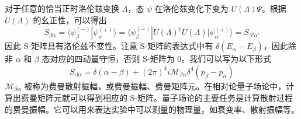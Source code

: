 对于任意的恰当正时洛伦兹变换 $\Lambda$，态 $\psi$ 在洛伦兹变化下变为 $U(\Lambda)\Psi$。根据 $U(\Lambda)$ 的幺正性，可以得出
\begin{equation}\label{eq_Smat_1}
S_{\beta\alpha}=\langle \psi_\beta^{(-)}| \psi_\alpha^{(+)} \rangle=\langle \psi_\beta^{(-)}| U(\Lambda)^\dagger U(\Lambda) |\psi_\alpha^{(+)} \rangle=S_{\beta'\alpha'}
\end{equation}
因此 S-矩阵具有洛伦兹不变性。注意 S-矩阵的表达式中有 $\delta(E_\alpha-E_\beta)$，因此除非 $\alpha$ 和 $\beta$ 态对应的四动量守恒，否则 S-矩阵为 $0$。我们可以写为以下形式
\begin{equation}
S_{\beta\alpha}=\delta(\alpha-\beta)+(2\pi)^4 i \mathcal{M}_{\beta\alpha}\delta^4(p_\beta-p_\alpha)
\end{equation}
$\mathcal{M}_{\beta\alpha}$ 被称为费曼散射振幅，或费曼振幅、费曼矩阵元。在相对论量子场论中，计算出费曼矩阵元就可以得到相应的 S-矩阵。量子场论的主要任务是计算散射过程的费曼振幅。它可以用来表达实验中可以测量的物理量，如衰变率、散射振幅等。
